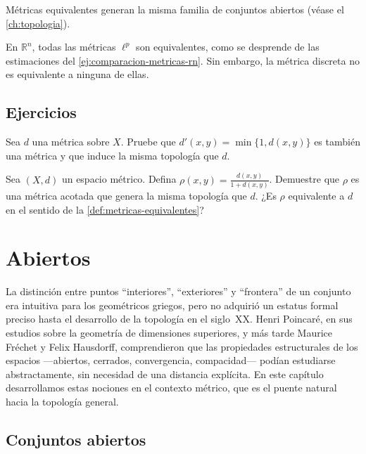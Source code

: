\begin{proposition}
\label{prop:equiv-misma-topologia}
Métricas equivalentes generan la misma familia de conjuntos abiertos (véase el \cref{ch:topologia}).
\end{proposition}

\begin{example}
En $\mathbb{R}^n$, todas las métricas $\ell^p$ son equivalentes, como se desprende de las estimaciones del \cref{ej:comparacion-metricas-rn}. Sin embargo, la métrica discreta no es equivalente a ninguna de ellas.
\end{example}

\subsection{Ejercicios}

\begin{exercise}
Sea $d$ una métrica sobre $X$. Pruebe que $d'(x,y)=\min\{1,d(x,y)\}$ es también una métrica y que induce la misma topología que $d$.
\end{exercise}

\begin{problem}
Sea $(X,d)$ un espacio métrico. Defina $\rho(x,y)=\frac{d(x,y)}{1+d(x,y)}$. Demuestre que $\rho$ es una métrica acotada que genera la misma topología que $d$. ¿Es $\rho$ equivalente a $d$ en el sentido de la \cref{def:metricas-equivalentes}?
\end{problem}

\section{Abiertos}

La distinción entre puntos ``interiores'', ``exteriores'' y ``frontera'' de un conjunto era intuitiva para los geométricos griegos, pero no adquirió un estatus formal preciso hasta el desarrollo de la topología en el siglo~XX. Henri Poincaré, en sus estudios sobre la geometría de dimensiones superiores, y más tarde Maurice Fréchet y Felix Hausdorff, comprendieron que las propiedades estructurales de los espacios ---abiertos, cerrados, convergencia, compacidad--- podían estudiarse abstractamente, sin necesidad de una distancia explícita. En este capítulo desarrollamos estas nociones en el contexto métrico, que es el puente natural hacia la topología general.

\subsection{Conjuntos abiertos}

